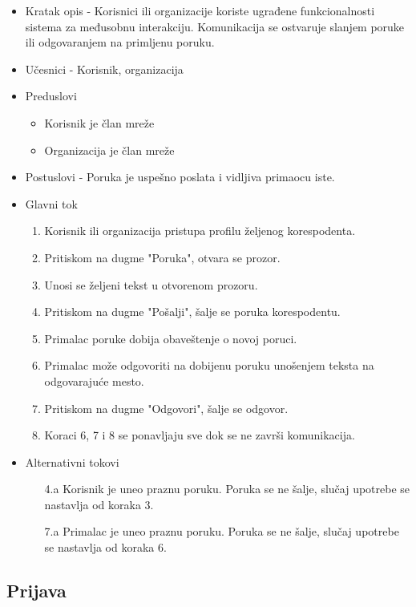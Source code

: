 \begin{itemize}
\item Kratak opis - Korisnici ili organizacije koriste ugrađene funkcionalnosti sistema za međusobnu interakciju. Komunikacija se ostvaruje slanjem poruke ili odgovaranjem na primljenu poruku.
\item Učesnici - Korisnik, organizacija
\item Preduslovi 
    \begin{itemize}
	\item Korisnik je član mreže
	\item Organizacija je član mreže
	\end{itemize}
\item Postuslovi - Poruka je uspešno poslata i vidljiva primaocu iste.
\item Glavni tok
	\begin{enumerate}
		\item Korisnik ili organizacija pristupa profilu željenog korespodenta.
		\item Pritiskom na dugme "Poruka", otvara se prozor. 
		\item Unosi se željeni tekst u otvorenom prozoru. 
		\item Pritiskom na dugme "Pošalji", šalje se poruka korespodentu.
		\item Primalac poruke dobija obaveštenje o novoj poruci.
		\item Primalac može odgovoriti na dobijenu poruku unošenjem teksta na odgovarajuće mesto.
		\item Pritiskom na dugme "Odgovori", šalje se odgovor.
		\item Koraci 6, 7 i 8 se ponavljaju sve dok se ne završi komunikacija.
	\end{enumerate}
\item Alternativni tokovi
    \begin{itemize}
		\item[4.a] Korisnik je uneo praznu poruku. Poruka se ne šalje, slučaj upotrebe se nastavlja od koraka 3.
		\item[7.a] Primalac je uneo praznu poruku. Poruka se ne šalje, slučaj upotrebe se nastavlja od koraka 6.
	\end{itemize}
\end{itemize}

\subsection{Prijava}
